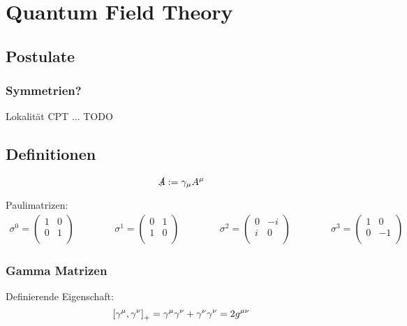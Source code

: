 \section{Quantum Field Theory} %
	\subsection{Postulate}
		\subsubsection{Symmetrien?}
			Lokalität
			CPT
			...
			TODO
	\subsection{Definitionen}
		\begin{equation}
			\slashed{A} := \gamma_\mu A^\mu
		\end{equation}

		\noindent
		Paulimatrizen:
		\begin{equation}
			\begin{aligned}
				\sigma^0 = \left(\begin{matrix}
					1 & 0 \\
					0 & 1 \\
				\end{matrix}\right) &&\hspace{30pt}
				\sigma^1 = \left(\begin{matrix}
					0 & 1 \\
					1 & 0 \\
				\end{matrix}\right) &&\hspace{30pt}
				\sigma^2 = \left(\begin{matrix}
					0 & -i \\
						i & 0 \\
				\end{matrix}\right) &&\hspace{30pt}
				\sigma^3 = \left(\begin{matrix}
					1 & 0 \\
					0 & -1 \\
				\end{matrix}\right)
			\end{aligned}
		\end{equation}

		\subsubsection{Gamma Matrizen}
			\noindent
			Definierende Eigenschaft:
			\begin{equation}
				\left[\gamma^\mu,\gamma^\nu\right]_{+} = \gamma^\mu \gamma^\nu + \gamma^\nu \gamma^\nu = 2g^{\mu\nu}
			\end{equation}

